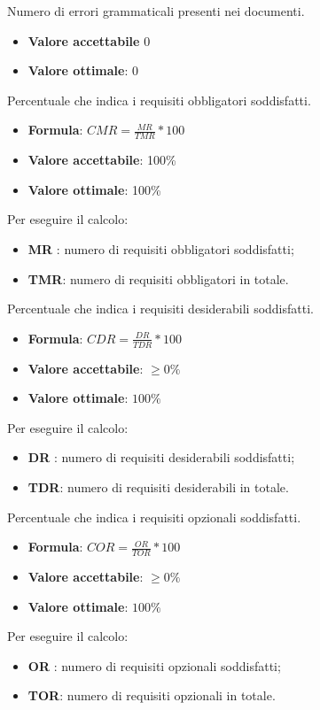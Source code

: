 Numero di errori grammaticali presenti nei documenti.
\begin{itemize}
    \item \textbf{Valore accettabile} $0$
    \item \textbf{Valore ottimale}: $0$
\end{itemize}  

Percentuale che indica i requisiti obbligatori soddisfatti.
\begin{itemize}
    \item \textbf{Formula}: $CMR=\frac{MR}{TMR}*100$
    \item \textbf{Valore accettabile}: 100\%
    \item \textbf{Valore ottimale}: 100\%
\end{itemize}
Per eseguire il calcolo:
\begin{itemize}
    \item \textbf{MR} : numero di requisiti obbligatori soddisfatti;
    \item \textbf{TMR}: numero di requisiti obbligatori in totale.
\end{itemize} 

Percentuale che indica i requisiti desiderabili soddisfatti.
\begin{itemize}
    \item \textbf{Formula}: $CDR=\frac{DR}{TDR}*100$
    \item \textbf{Valore accettabile}: $\geq0\%$
    \item \textbf{Valore ottimale}: $100\%$
\end{itemize}  
Per eseguire il calcolo:
\begin{itemize}
    \item \textbf{DR} : numero di requisiti desiderabili soddisfatti;
    \item \textbf{TDR}: numero di requisiti desiderabili in totale.
\end{itemize} 


Percentuale che indica i requisiti opzionali soddisfatti.
\begin{itemize}
    \item \textbf{Formula}: $COR=\frac{OR}{TOR}*100$
    \item \textbf{Valore accettabile}: $\geq0\%$
    \item \textbf{Valore ottimale}: $100\%$
\end{itemize}  
Per eseguire il calcolo:
\begin{itemize}
    \item \textbf{OR} : numero di requisiti opzionali soddisfatti;
    \item \textbf{TOR}: numero di requisiti opzionali in totale.
\end{itemize} 

